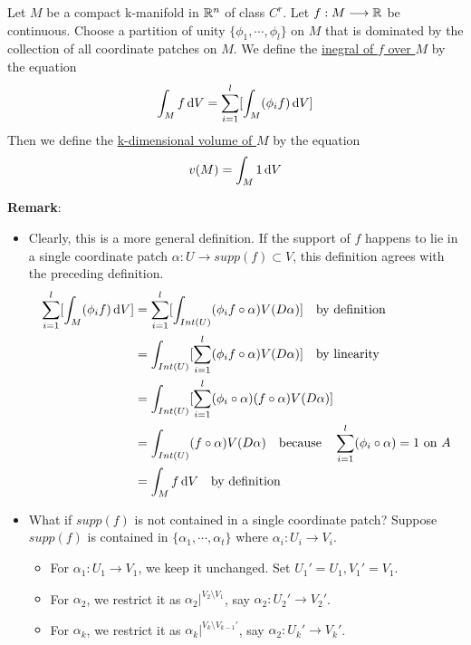 \begin{definition}
    Let $M$ be a compact k-manifold in $\mathbb{R}^n$ of class $C^r$. Let $f:M\longrightarrow \mathbb{R}$ be continuous. 
    Choose a partition of unity $\{\phi_1,\cdots,\phi_l\}$ on $M$ that is dominated by the collection of all coordinate patches on $M$. 
    We define the \underline{inegral of $f$ over $M$} by the equation 
    $$\int_Mf\operatorname{d\!} V=\sum_{i=1}^l[\int_M(\phi_if)\operatorname{d\!} V]$$
    Then we define the \underline{k-dimensional volume of $M$} by the equation 
    $$v(M)=\int_M1\operatorname{d\!} V$$
\end{definition}
\noindent\textbf{Remark}:
\begin{itemize}
    \item Clearly, this is a more general definition. If the support of $f$ happens to lie in a single coordinate patch $\alpha:U\longrightarrow supp(f)\subset V$, this definition agrees with the preceding definition.
    \begin{equation*}
        \begin{split}
            \sum_{i=1}^l[\int_M(\phi_if)\operatorname{d\!} V] &= \sum_{i=1}^l[\int_{Int(U)}(\phi_if\circ \alpha)V(D\alpha)] \text{\quad by definition}\\
            &= \int_{Int(U)}[\sum_{i=1}^l(\phi_if\circ \alpha)V(D\alpha)] \text{\quad by linearity}\\
            &= \int_{Int(U)}[\sum_{i=1}^l(\phi_i\circ \alpha)(f\circ \alpha)V(D\alpha)]\\
            &= \int_{Int(U)}(f\circ\alpha)V(D\alpha)\text{\quad because\quad} \sum_{i=1}^l(\phi_i\circ\alpha)=1 \text{ on $A$}\\
            &= \int_Mf\operatorname{d\!} V \text{\quad by definition}
        \end{split}
    \end{equation*}
    \item What if $supp(f)$ is not contained in a single coordinate patch? Suppose $supp(f)$ is contained in $\{\alpha_1,\cdots,\alpha_t\}$ where $\alpha_i:U_i\longrightarrow V_i$.
    \begin{itemize}
        \item For $\alpha_1:U_1\longrightarrow V_1$, we keep it unchanged. Set $U_1'=U_1,V_1'=V_1$.
        \item For $\alpha_2$, we restrict it as $\alpha_2\big|^{V_2\setminus V_1}$, say $\alpha_2:U_2'\longrightarrow V_2'$.
        \item For $\alpha_k$, we restrict it as $\alpha_k\big|^{V_k\setminus V_{k-1}'}$, say $\alpha_2:U_k'\longrightarrow V_k'$.

\end{itemize}
\end{itemize}
